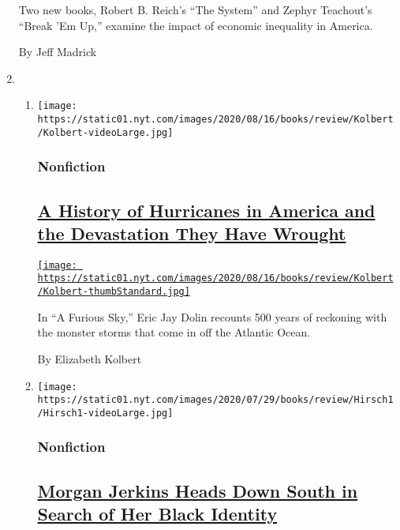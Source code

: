 \begin{enumerate}
  Two new books, Robert B. Reich's ``The System'' and Zephyr Teachout's
  ``Break 'Em Up,'' examine the impact of economic inequality in
  America.

  By Jeff Madrick
\item
  \begin{enumerate}
  \def\labelenumii{\arabic{enumii}.}
  \item
    \texttt{[image: https://static01.nyt.com/images/2020/08/16/books/review/Kolbert/Kolbert-videoLarge.jpg]}

    \hypertarget{nonfiction-2}{%
    \subsubsection{Nonfiction}\label{nonfiction-2}}

    \hypertarget{a-history-of-hurricanes-in-america-and-the-devastation-they-have-wrought}{%
    \subsection{\texorpdfstring{\href{/2020/08/04/books/review/a-furious-sky-hurricanes-eric-jay-dolan.html}{A
    History of Hurricanes in America and the Devastation They Have
    Wrought}}{A History of Hurricanes in America and the Devastation They Have Wrought}}\label{a-history-of-hurricanes-in-america-and-the-devastation-they-have-wrought}}

    \href{/2020/08/04/books/review/a-furious-sky-hurricanes-eric-jay-dolan.html}{\texttt{[image: https://static01.nyt.com/images/2020/08/16/books/review/Kolbert/Kolbert-thumbStandard.jpg]}}

    In ``A Furious Sky,'' Eric Jay Dolin recounts 500 years of reckoning
    with the monster storms that come in off the Atlantic Ocean.

    By Elizabeth Kolbert
  \item
    \texttt{[image: https://static01.nyt.com/images/2020/07/29/books/review/Hirsch1/Hirsch1-videoLarge.jpg]}

    \hypertarget{nonfiction-3}{%
    \subsubsection{Nonfiction}\label{nonfiction-3}}

    \hypertarget{morgan-jerkins-heads-down-south-in-search-of-her-black-identity}{%
    \subsection{\texorpdfstring{\href{/2020/08/03/books/review/wandering-in-strange-lands-morgan-jerkins.html}{Morgan
    Jerkins Heads Down South in Search of Her Black
    Identity}}{Morgan Jerkins Heads Down South in Search of Her Black Identity}}\label{morgan-jerkins-heads-down-south-in-search-of-her-black-identity}}


\end{enumerate}
\end{enumerate}
